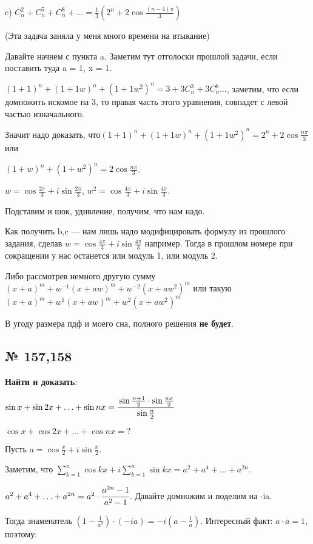 \documentclass{article}
\begin{document}
c) $C_n^2 + C_n^5 + C_n^8 + \ldots = \frac{1}{3}(2^{n}+2\cos\frac{(n-4) \pi}{3} ) $

(Эта задача заняла у меня много времени на втыкание)

Давайте начнем с пункта a. Заметим тут отголоски прошлой задачи, если поставить туда a = 1, x = 1.

$(1+1)^n + (1+1w)^n+(1+1w^2)^n = 3 + 3C_n^3 +3C_n^6 \ldots$, заметим, что если домножить искомое на 3, то правая часть этого уравнения, совпадет с левой частью изначального.

Значит надо доказать, что$(1+1)^n + (1+1w)^n+(1+1w^2)^n = 2^{n}+2\cos\frac{n \pi}{3}$ или 

$(1+w)^n+(1+w^2)^n = 2\cos\frac{n \pi}{3}$.  

$w =\cos \frac{2\pi}{3} + i\sin \frac{2\pi}{3}$, $w^2 =\cos \frac{4\pi}{3} + i\sin \frac{4\pi}{3}$.

Подставим и шок, удивление, получим, что нам надо.

Как получить b,c --- нам лишь надо модифицировать формулу из прошлого задания, сделав  $w =\cos \frac{4\pi}{3} + i\sin \frac{4\pi}{3}$ например. Тогда в прошлом номере при сокращении у нас останется или модуль 1, или модуль 2.

Либо рассмотрев немного другую сумму $(x+a)^m + w^{-1}(x+aw)^m+w^{-2}(x+aw^2)^m $ или такую 
$(x+a)^m + w^{1}(x+aw)^m+w^{2}(x+aw^2)^m$

В угоду размера пдф и моего сна, полного решения \textbf{не будет}.
\pagebreak
\subsection{№ 157,158}

\textbf{Найти и доказать}:

$\sin x + \sin 2x + \ldots +\sin nx = \cfrac{\sin \frac{n+1}{2}\cdot \sin \frac{nx}{2}}{\sin\frac{n}{2}}$

$\cos x + \cos 2x + \ldots +\cos nx = ?$

Пусть $a =\cos \frac{x}{2} + i\sin \frac{x}{2}.$

Заметим, что $\sum\limits_{k=1}^n \cos kx + i\sum\limits_{k=1}^n \sin kx =a^2 +a^4 + \ldots + a^{2n}.$


$a^2 +a^4 + \ldots + a^{2n} = a^2 \cdot \cfrac{a^{2n}-1}{a^2-1}$. Давайте домножим и поделим на -ia.

Тогда знаменатель $(1-\frac{1}{a^2}) \cdot (-ia) = -i(a-\frac{1}{a})$. Интересный факт: $a\cdot \overline{a} = 1$, поэтому:
\end{document}
